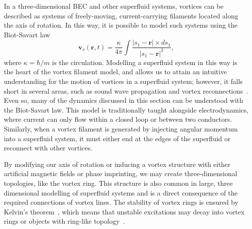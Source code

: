 In a three-dimensional BEC and other superfluid systems, vortices can be described as systems of freely-moving, current-carrying filaments located along the axis of rotation. 
In this way, it is possible to model such systems using the Biot-Savart law ~\cite{schwarz1985}
\begin{equation}
    \boldsymbol{v}_s(\boldsymbol{r},t) = \frac{\kappa}{4\pi}\int\frac{|s_1-\boldsymbol{r}|\times ds_1}{|s_1-\boldsymbol{r}|^3},
\label{eqn:BS}
\end{equation}
where $\kappa = \hbar / m$ is the circulation. 
Modelling a superfluid system in this way is the heart of the vortex filament model, and allows us to attain an intuitive understanding for the motion of vortices in a superfluid system; however, it falls short in several areas, such as sound wave propagation and vortex reconnections~\cite{zuccher2012}. 
Even so, many of the dynamics discussed in this section can be understood with the Biot-Savart law.
This model is traditionally taught alongside electrodynamics, where current can only flow within a closed loop or between two conductors.
Similarly, when a vortex filament is generated by injecting angular momentum into a superfluid system, it must either end at the edges of the superfluid or reconnect with other vortices.

By modifying our axis of rotation or inducing a vortex structure with either artificial magnetic fields or phase imprinting, we may create three-dimensional topologies, like the vortex ring.
This structure is also common in large, three dimensional modelling of superfluid systems and is a direct consequence of the required connections of vortex lines.
The stability of vortex rings is ensured by Kelvin's theorem~\cite{donnelly1991}, which means that unstable excitations may decay into vortex rings or objects with ring-like topology~\cite{anderson2001}.


